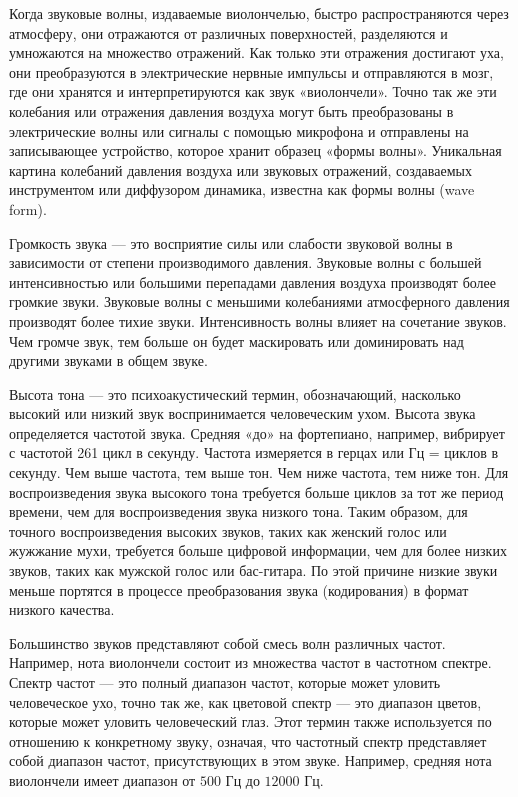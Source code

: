 \documentclass[oneside,final,14pt]{extreport}
\begin{document}
Когда звуковые волны, издаваемые виолончелью, быстро распространяются через атмосферу, они отражаются от различных поверхностей, разделяются и умножаются на множество отражений. Как только эти отражения достигают уха, они преобразуются в электрические нервные импульсы и отправляются в мозг, где они хранятся и интерпретируются как звук «виолончели». Точно так же эти колебания или отражения давления воздуха могут быть преобразованы в электрические волны или сигналы с помощью микрофона и отправлены на записывающее устройство, которое хранит образец «формы волны». Уникальная картина колебаний давления воздуха или звуковых отражений, создаваемых инструментом или диффузором динамика, известна как формы волны (wave form).

Громкость звука — это восприятие силы или слабости звуковой волны в зависимости от степени производимого давления. Звуковые волны с большей интенсивностью или большими перепадами давления воздуха производят более громкие звуки. Звуковые волны с меньшими колебаниями атмосферного давления производят более тихие звуки. Интенсивность волны влияет на сочетание звуков. Чем громче звук, тем больше он будет маскировать или доминировать над другими звуками в общем звуке.

Высота тона — это психоакустический термин, обозначающий, насколько высокий или низкий звук воспринимается человеческим ухом. Высота звука определяется частотой звука. Средняя «до» на фортепиано, например, вибрирует с частотой 261 цикл в секунду. Частота измеряется в герцах или Гц = циклов в секунду. Чем выше частота, тем выше тон. Чем ниже частота, тем ниже тон. Для воспроизведения звука высокого тона требуется больше циклов за тот же период времени, чем для воспроизведения звука низкого тона. Таким образом, для точного воспроизведения высоких звуков, таких как женский голос или жужжание мухи, требуется больше цифровой информации, чем для более низких звуков, таких как мужской голос или бас-гитара. По этой причине низкие звуки меньше портятся в процессе преобразования звука (кодирования) в формат низкого качества. 

Большинство звуков представляют собой смесь волн различных частот. Например, нота виолончели состоит из множества частот в частотном спектре. Спектр частот — это полный диапазон частот, которые может уловить человеческое ухо, точно так же, как цветовой спектр — это диапазон цветов, которые может уловить человеческий глаз. Этот термин также используется по отношению к конкретному звуку, означая, что частотный спектр представляет собой диапазон частот, присутствующих в этом звуке. Например, средняя нота виолончели имеет диапазон от $500$ Гц до $12 000$ Гц.
\end{document}
